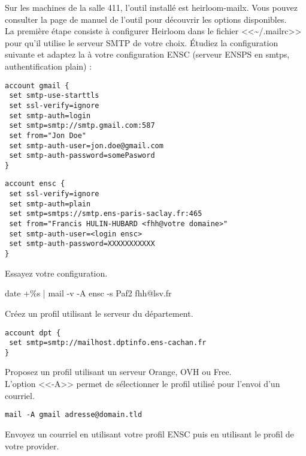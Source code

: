 \documentclass[11pt]{article}
\begin{document}
Sur les machines de la salle 411, l'outil installé est heirloom-mailx. Vous
pouvez consulter la page de manuel de l'outil pour découvrir les options
disponibles.\\

La première étape consiste à configurer Heirloom dans le fichier
<<\textasciitilde{}/.mailrc>> pour qu'il utilise le serveur SMTP de votre
choix. Étudiez la configuration suivante et adaptez la à votre configuration
ENSC (serveur ENSPS en smtps, authentification plain) :

\begin{lstlisting}
account gmail {
 set smtp-use-starttls
 set ssl-verify=ignore
 set smtp-auth=login
 set smtp=smtp://smtp.gmail.com:587
 set from="Jon Doe"
 set smtp-auth-user=jon.doe@gmail.com
 set smtp-auth-password=somePasword
}
\end{lstlisting}

\begin{solution}
\begin{lstlisting}
account ensc {
 set ssl-verify=ignore
 set smtp-auth=plain
 set smtp=smtps://smtp.ens-paris-saclay.fr:465
 set from="Francis HULIN-HUBARD <fhh@votre domaine>"
 set smtp-auth-user=<login ensc>
 set smtp-auth-password=XXXXXXXXXXX
}
\end{lstlisting}
\end{solution}

Essayez votre configuration.

\begin{solution}
date +\%s | mail -v -A ensc -s Paf2 fhh@lsv.fr
\end{solution}

Créez un profil utilisant le serveur du département.

\begin{solution}
\begin{lstlisting}
account dpt {
 set smtp=smtp://mailhost.dptinfo.ens-cachan.fr
}
\end{lstlisting}
\end{solution}

Proposez un profil utilisant un serveur Orange, OVH ou Free.\\

L'option <<-A>> permet de sélectionner le profil utilisé pour l'envoi d'un
courriel. 

\begin{lstlisting}
mail -A gmail adresse@domain.tld
\end{lstlisting}

Envoyez un courriel en utilisant votre profil ENSC puis en utilisant le
profil de votre provider.\\
\end{document}
